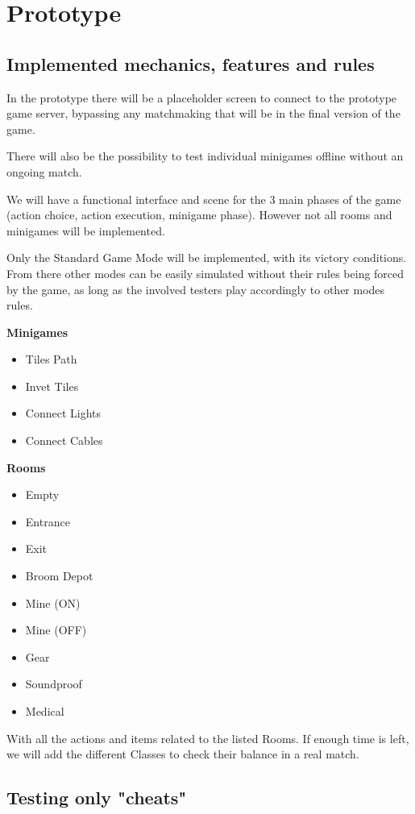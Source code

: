\section{Prototype}

\subsection{Implemented mechanics, features and rules}
In the prototype there will be a placeholder screen to connect to the prototype game server, bypassing any matchmaking that will be in the final version of the game.

There will also be the possibility to test individual minigames offline without an ongoing match.

We will have a functional interface and scene for the 3 main phases of the game (action choice, action execution, minigame phase).
However not all rooms and minigames will be implemented.

Only the Standard Game Mode will be implemented, with its victory conditions. From there other modes can be easily simulated without their rules being forced by the game, as long as the involved testers play accordingly to other modes rules.

\textbf{Minigames}
\begin{itemize}
	\item Tiles Path
	\item Invet Tiles
	\item Connect Lights
	\item Connect Cables
\end{itemize}

\textbf{Rooms}
\begin{itemize}
	\item Empty
	\item Entrance
	\item Exit
	\item Broom Depot
	\item Mine (ON)
	\item Mine (OFF)
	\item Gear
	\item Soundproof
	\item Medical
\end{itemize}

With all the actions and items related to the listed Rooms.
If enough time is left, we will add the different Classes to check their balance in a real match.

\subsection{Testing only "cheats"}

